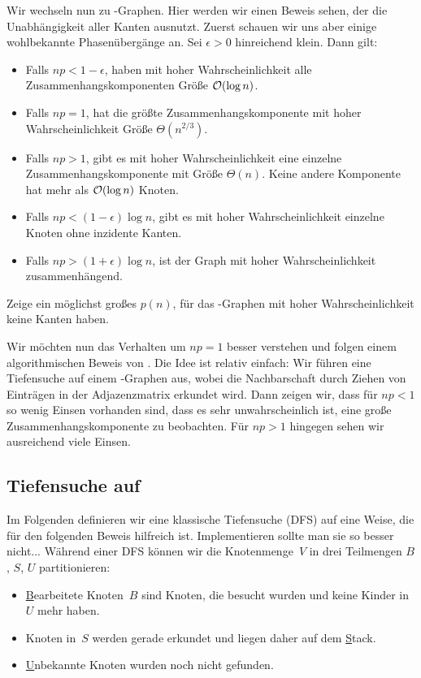 Wir wechseln nun zu \Gnp-Graphen.
Hier werden wir einen Beweis sehen, der die Unabhängigkeit aller Kanten ausnutzt.
Zuerst schauen wir uns aber einige wohlbekannte Phasenübergänge an.
Sei $\epsilon >0$ hinreichend klein.
Dann gilt:
\begin{itemize}
    \item Falls $np < 1 - \epsilon$, haben mit hoher Wahrscheinlichkeit alle Zusammenhangskomponenten Größe $\mathcal{O}\!\left(\log n\right)$.
    \item Falls $np = 1$, hat die größte Zusammenhangskomponente mit hoher Wahrscheinlichkeit Größe $\Theta(n^{2/3})$.
    \item Falls $np > 1$, gibt es mit hoher Wahrscheinlichkeit eine einzelne Zusammenhangskomponente mit Größe $\Theta(n)$.
          Keine andere Komponente hat mehr als $\mathcal{O}\!\left(\log n\right)$ Knoten.

    \item Falls $np < (1-\epsilon)\log n$, gibt es mit hoher Wahrscheinlichkeit einzelne Knoten ohne inzidente Kanten.
    \item Falls $np > (1+\epsilon)\log n$, ist der Graph mit hoher Wahrscheinlichkeit zusammenhängend.
\end{itemize}

\begin{exercise}
    Zeige ein möglichst großes $p(n)$, für das \Gnp-Graphen mit hoher Wahrscheinlichkeit keine Kanten haben.
\end{exercise}

Wir möchten nun das Verhalten um $np = 1$ besser verstehen und folgen einem algorithmischen Beweis von \cite{DBLP:journals/rsa/KrivelevichS13}.
Die Idee ist relativ einfach:
Wir führen eine Tiefensuche auf einem \Gnp-Graphen aus, wobei die Nachbarschaft durch Ziehen von Einträgen in der Adjazenzmatrix erkundet wird.
Dann zeigen wir, dass für $np < 1$ so wenig Einsen vorhanden sind, dass es sehr unwahrscheinlich ist, eine große Zusammenhangskomponente zu beobachten.
Für $np > 1$ hingegen sehen wir ausreichend viele Einsen.

\subsection{Tiefensuche auf \Gnp}
Im Folgenden definieren wir eine klassische Tiefensuche (DFS) auf eine Weise, die für den folgenden Beweis hilfreich ist.
Implementieren sollte man sie so besser nicht...
Während einer DFS können wir die Knotenmenge~$V$ in drei Teilmengen $B$, $S$, $U$ partitionieren:
\begin{itemize}
    \item \underline Bearbeitete Knoten~$B$ sind Knoten, die besucht wurden und keine Kinder in $U$ mehr haben.
    \item Knoten in~$S$ werden gerade erkundet und liegen daher auf dem \underline Stack.
    \item \underline Unbekannte Knoten wurden noch nicht gefunden.
\end{itemize}

